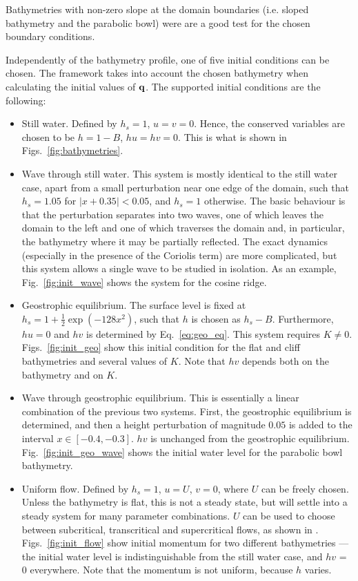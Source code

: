 Bathymetries with non-zero slope at the domain boundaries (i.e. sloped bathymetry and the parabolic bowl) were are a good test for the chosen boundary conditions.

Independently of the bathymetry profile, one of five initial conditions can be chosen. The framework takes into account the chosen bathymetry when calculating the initial values of $\vb q$. The supported initial conditions are the following:

\begin{itemize}
  \item Still water. Defined by $h_s = 1$, $u = v = 0$. Hence, the conserved variables are chosen to be $h = 1 - B$, $hu = hv = 0$. This is what is shown in Figs.~\ref{fig:bathymetries}.
  \item Wave through still water. This system is mostly identical to the still water case, apart from a small perturbation near one edge of the domain, such that $h_s = 1.05$ for $|x + 0.35| < 0.05$, and $h_s = 1$ otherwise. The basic behaviour is that the perturbation separates into two waves, one of which leaves the domain to the left and one of which traverses the domain and, in particular, the bathymetry where it may be partially reflected. The exact dynamics (especially in the presence of the Coriolis term) are more complicated, but this system allows a single wave to be studied in isolation. As an example, Fig.~\ref{fig:init_wave} shows the system for the cosine ridge.
  \item Geostrophic equilibrium. The surface level is fixed at $h_s = 1 + \frac{1}{2} \exp (-128 x^2)$, such that $h$ is chosen as $h_s - B$. Furthermore, $hu = 0$ and $hv$ is determined by Eq.~\ref{eq:geo_eq}. This system requires $K \neq 0$. Figs.~\ref{fig:init_geo} show this initial condition for the flat and cliff bathymetries and several values of $K$. Note that $hv$ depends both on the bathymetry and on $K$.
  \item Wave through geostrophic equilibrium. This is essentially a linear combination of the previous two systems. First, the geostrophic equilibrium is determined, and then a height perturbation of magnitude $0.05$ is added to the interval $x \in [-0.4, -0.3]$. $hv$ is unchanged from the geostrophic equilibrium. Fig.~\ref{fig:init_geo_wave} shows the initial water level for the parabolic bowl bathymetry.
  \item Uniform flow. Defined by $h_s = 1$, $u = U$, $v = 0$, where $U$ can be freely chosen. Unless the bathymetry is flat, this is not a steady state, but will settle into a steady system for many parameter combinations. $U$ can be used to choose between subcritical, transcritical and supercritical flows, as shown in \citet{esler2005steady}. Figs.~\ref{fig:init_flow} show initial momentum for two different bathymetries --- the initial water level is indistinguishable from the still water case, and $hv$ = 0 everywhere. Note that the momentum is not uniform, because $h$ varies.
\end{itemize}

